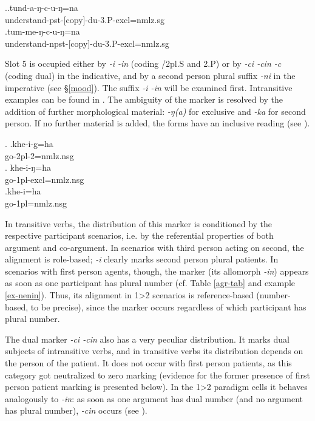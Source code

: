 \ex.\ag.tund-a-ŋ-c-u-ŋ=na\\
understand{\sc -pst-[copy]-du-3.P-excl=nmlz.sg}\\
\bg.tum-me-ŋ-c-u-ŋ=na\\
understand{\sc -npst-[copy]-du-3.P-excl=nmlz.sg}\\

Slot 5 is occupied either by \emph{-i \ti -in} (coding {/2pl.S} and {\sc 2.P}) or by \emph{-ci \ti -cin \ti -c} (coding dual) in the indicative, and by a second person plural suffix \emph{-ni} in the imperative (see §\ref{mood}). The suffix \emph{-i \ti -in} will be examined first. Intransitive examples can be found in \Next. The ambiguity of the marker is resolved by the addition of further morphological material: \emph{-ŋ(a)} for exclusive and \emph{-ka} for second person. If no further material is added, the forms have an inclusive reading (see \Next[c]).

	\ex. \ag.khe-i-g=ha\\
	go{\sc [pst]-2pl-2=nmlz.nsg}\\
	\bg. khe-i-ŋ=ha\\
	go{\sc [pst]-1pl-excl=nmlz.nsg}\\
	\bg.khe-i=ha\\
	go{\sc [pst]-1pl=nmlz.nsg}\\

In transitive verbs, the distribution of this marker is conditioned by the respective participant  scenarios, i.e. by the referential properties of both argument and co-argument. In scenarios with third person acting on second, the alignment is role-based; \emph{-i} clearly marks second person plural patients. In scenarios with first person agents, though, the marker (its allomorph \emph{-in}) appears as soon as one parti\-cipant has plural number (cf. Table \ref{agr-tab} and example \ref{ex-nenin}). Thus, its alignment in 1>2 scenarios is reference-based (number-based, to be precise), since the marker occurs regardless of which participant has plural number. 

The dual marker \emph{-ci \ti -cin} also has a very peculiar distribution. It marks dual subjects of intransitive verbs, and in transitive verbs its distribution  depends on the person of the patient. It does not occur with first person patients, as this category got neutralized to zero marking (evidence for the former presence of first person patient marking is presented below). In the 1>2 paradigm cells it behaves analogously to \emph{-in}: as soon as one argument has dual number (and no argument has plural number), \emph{-cin} occurs (see \Next). 

